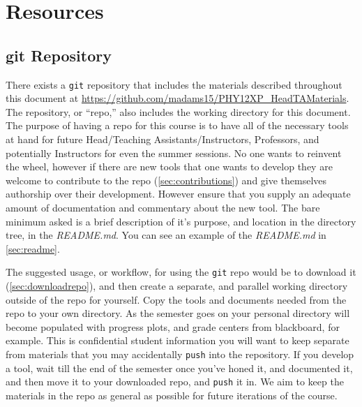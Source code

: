 \documentclass[12pt]{article}
\begin{document}
\section{Resources} \label{sec:resources}

\subsection{git Repository} \label{sec:gitrepo}

\indent There exists a \texttt{git} repository that includes the materials described throughout this document at \url{https://github.com/madams15/PHY12XP\_HeadTAMaterials}. The repository, or ``repo,'' also includes the working directory for this document. The purpose of having a repo for this course is to have all of the necessary tools at hand for future Head/Teaching Assistants/Instructors, Professors, and potentially Instructors for even the summer sessions. No one wants to reinvent the wheel, however if there are new tools that one wants to develop they are welcome to contribute to the repo (\ref{sec:contributions}) and give themselves authorship over their development. However ensure that you supply an adequate amount of documentation and commentary about the new tool. The bare minimum asked is a brief description of it's purpose, and location in the directory tree, in the \emph{README.md}. You can see an example of the \emph{README.md} in \ref{sec:readme}.

\indent The suggested usage, or workflow, for using the \texttt{git} repo would be to download it (\ref{sec:downloadrepo}), and then create a separate, and parallel working directory outside of the repo for yourself. Copy the tools and documents needed from the repo to your own directory. As the semester goes on your personal directory will become populated with progress plots, and grade centers from blackboard, for example. This is confidential student information you will want to keep separate from materials that you may accidentally \texttt{push} into the repository. If you develop a tool, wait till the end of the semester once you've honed it, and documented it, and then move it to your downloaded repo, and \texttt{push} it in. We aim to keep the materials in the repo as general as possible for future iterations of the course.
\end{document}
